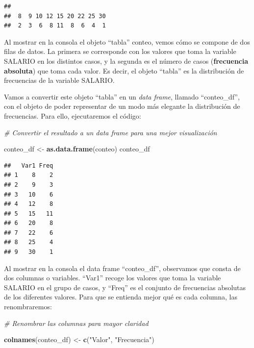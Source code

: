 \documentclass[
]{book}
\newenvironment{Shaded}{\begin{snugshade}}{\end{snugshade}}
\newcommand{\CommentTok}[1]{\textcolor[rgb]{0.56,0.35,0.01}{\textit{#1}}}
\newcommand{\FunctionTok}[1]{\textcolor[rgb]{0.13,0.29,0.53}{\textbf{#1}}}
\newcommand{\NormalTok}[1]{#1}
\newcommand{\OtherTok}[1]{\textcolor[rgb]{0.56,0.35,0.01}{#1}}
\newcommand{\StringTok}[1]{\textcolor[rgb]{0.31,0.60,0.02}{#1}}
\begin{document}
\begin{verbatim}
## 
##  8  9 10 12 15 20 22 25 30 
##  2  3  6  8 11  8  6  4  1
\end{verbatim}

Al mostrar en la consola el objeto ``tabla'' conteo, vemos cómo se compone de dos filas de datos.
La primera se corresponde con los valores que toma la variable SALARIO en los distintos casos, y la segunda es el número de casos (\textbf{frecuencia absoluta}) que toma cada valor.
Es decir, el objeto ``tabla'' es la distribución de frecuencias de la variable SALARIO.

Vamos a convertir este objeto ``tabla'' en un \emph{data frame}, llamado ``conteo\_df'', con el objeto de poder representar de un modo más elegante la distribución de frecuencias.
Para ello, ejecutaremos el código:

\begin{Shaded}
\begin{Highlighting}[]
\CommentTok{\# Convertir el resultado a un data frame para una mejor visualización}

\NormalTok{conteo\_df }\OtherTok{\textless{}{-}} \FunctionTok{as.data.frame}\NormalTok{(conteo)}
\NormalTok{conteo\_df}
\end{Highlighting}
\end{Shaded}

\begin{verbatim}
##   Var1 Freq
## 1    8    2
## 2    9    3
## 3   10    6
## 4   12    8
## 5   15   11
## 6   20    8
## 7   22    6
## 8   25    4
## 9   30    1
\end{verbatim}

Al mostrar en la consola el data frame ``conteo\_df'', observamos que consta de dos columnas o variables.
``Var1'' recoge los valores que toma la variable SALARIO en el grupo de casos, y ``Freq'' es el conjunto de frecuencias absolutas de los diferentes valores.
Para que se entienda mejor qué es cada columna, las renombraremos:

\begin{Shaded}
\begin{Highlighting}[]
\CommentTok{\# Renombrar las columnas para mayor claridad}

\FunctionTok{colnames}\NormalTok{(conteo\_df) }\OtherTok{\textless{}{-}} \FunctionTok{c}\NormalTok{(}\StringTok{"Valor"}\NormalTok{, }\StringTok{"Frecuencia"}\NormalTok{)}
\end{Highlighting}
\end{Shaded}
\end{document}
